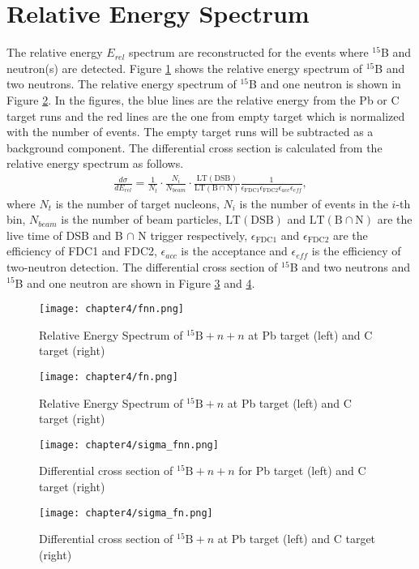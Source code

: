 \clearpage
\section{Relative Energy Spectrum}
The relative energy $E_{rel}$ spectrum are reconstructed for the events where $^{15}$B and neutron(s) are detected. Figure \ref{fig:rel_energy_fnn} shows the relative energy spectrum of $^{15}$B and two neutrons. The relative energy spectrum of $^{15}$B and one neutron is shown in Figure \ref{fig:rel_energy_fn}. In the figures, the blue lines are the relative energy from the Pb or C target runs and the red lines are the one from empty target which is normalized with the number of events. The empty target runs will be subtracted as a background component. 
The differential cross section is calculated from the relative energy spectrum as follows.
\begin{align}
    \frac{d\sigma}{dE_{rel}} = \frac{1}{N_t} \cdot \frac{N_{i}}{N_{beam}} \cdot \frac{\text{LT}(\text{DSB})}{\text{LT}(\text{B} \cap \text{N})} \frac{1}{\epsilon_{\text{FDC1}} \epsilon_{\text{FDC2}} \epsilon_{acc} \epsilon_{eff}},
\end{align}
where $N_t$ is the number of target nucleons, $N_{i}$ is the number of events in the $i$-th bin, $N_{beam}$ is the number of beam particles, $\text{LT}(\text{DSB})$ and $\text{LT}(\text{B} \cap \text{N})$ are the live time of DSB and B $\cap$ N trigger respectively, $\epsilon_{\text{FDC1}}$ and $\epsilon_{\text{FDC2}}$ are the efficiency of FDC1 and FDC2, $\epsilon_{acc}$ is the acceptance and $\epsilon_{eff}$ is the efficiency of two-neutron detection. The differential cross section of $^{15}$B and two neutrons and $^{15}$B and one neutron are shown in Figure \ref{fig:sigma_fnn} and \ref{fig:sigma_fn}. 

\clearpage
\begin{figure}
    \centering
    \texttt{[image: chapter4/fnn.png]}
    \caption{Relative Energy Spectrum of ${}^{15}\text{B} + n + n$ at Pb target (left) and C target (right)}
    \label{fig:rel_energy_fnn}
\end{figure}

\begin{figure}
    \centering
    \texttt{[image: chapter4/fn.png]}
    \caption{Relative Energy Spectrum of ${}^{15}\text{B} + n$ at Pb target (left) and C target (right)}
    \label{fig:rel_energy_fn}
\end{figure}

\clearpage
\begin{figure}
    \centering
    \texttt{[image: chapter4/sigma\_fnn.png]}
    \caption{Differential cross section of ${}^{15}\text{B} + n + n$ for Pb target (left) and C target (right)}
    \label{fig:sigma_fnn}
\end{figure}
\begin{figure}
    \centering
    \texttt{[image: chapter4/sigma\_fn.png]}
    \caption{Differential cross section of ${}^{15}\text{B} + n$ at Pb target (left) and C target (right)}
    \label{fig:sigma_fn}
\end{figure}
